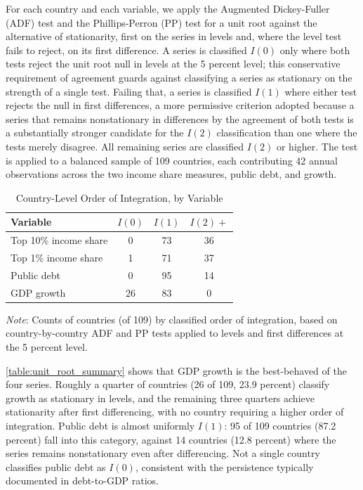 \documentclass[12pt, titlepage]{article}
\numberwithin{equation}{section}
\begin{document}
For each country and each variable, we apply the Augmented Dickey-Fuller
(ADF) test and the Phillips-Perron (PP) test for a unit root against the
alternative of stationarity, first on the series in levels and, where the
level test fails to reject, on its first difference. A series is classified
$I(0)$ only where both tests reject the unit root null in levels at the 5
percent level; this conservative requirement of agreement guards against
classifying a series as stationary on the strength of a single test. Failing
that, a series is classified $I(1)$ where either test rejects the null in
first differences, a more permissive criterion adopted because a series that
remains nonstationary in differences by the agreement of both tests is a
substantially stronger candidate for the $I(2)$ classification than one where
the tests merely disagree. All remaining series are classified $I(2)$ or
higher. The test is applied to a balanced sample of 109 countries, each
contributing 42 annual observations across the two income share measures,
public debt, and growth.

\begin{table}[htbp]
	\centering
	\caption{Country-Level Order of Integration, by Variable}
	\label{table:unit_root_summary}
	\begin{threeparttable}
		\begin{tabular}{lccc}
			\toprule
			\textbf{Variable} & \textbf{$I(0)$} & \textbf{$I(1)$} & \textbf{$I(2)+$} \\
			\midrule
			Top 10\% income share & 0  & 73 & 36 \\
			Top 1\% income share  & 1  & 71 & 37 \\
			Public debt           & 0  & 95 & 14 \\
			GDP growth            & 26 & 83 & 0  \\
			\bottomrule
		\end{tabular}
		\begin{tablenotes}
			\scriptsize
			\item \textit{Note}: Counts of countries (of 109) by classified order of
			integration, based on country-by-country ADF and PP tests applied to
			levels and first differences at the 5 percent level.
		\end{tablenotes}
	\end{threeparttable}
\end{table}

\autoref{table:unit_root_summary} shows that GDP growth is the best-behaved of
the four series. Roughly a quarter of countries (26 of 109, 23.9 percent)
classify growth as stationary in levels, and the remaining three quarters
achieve stationarity after first differencing, with no country requiring a
higher order of integration. Public debt is almost uniformly $I(1)$: 95 of 109
countries (87.2 percent) fall into this category, against 14 countries (12.8
percent) where the series remains nonstationary even after differencing. Not a
single country classifies public debt as $I(0)$, consistent with the
persistence typically documented in debt-to-GDP ratios.
\end{document}
